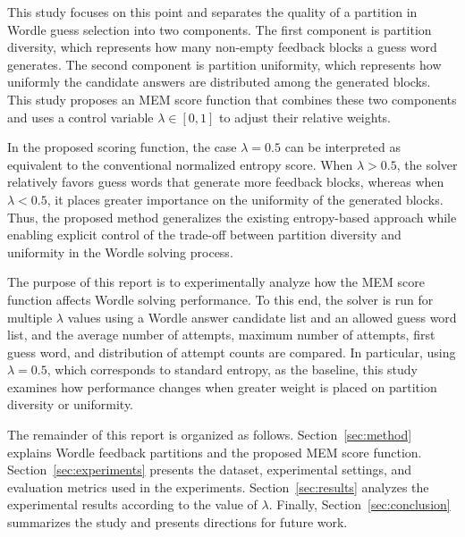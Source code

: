 \documentclass[11pt]{article}
\begin{document}
This study focuses on this point and separates the quality of a partition in Wordle guess selection into two components.
The first component is partition diversity, which represents how many non-empty feedback blocks a guess word generates.
The second component is partition uniformity, which represents how uniformly the candidate answers are distributed among the generated blocks.
This study proposes an MEM score function that combines these two components and uses a control variable $\lambda \in [0,1]$ to adjust their relative weights.

In the proposed scoring function, the case $\lambda = 0.5$ can be interpreted as equivalent to the conventional normalized entropy score.
When $\lambda > 0.5$, the solver relatively favors guess words that generate more feedback blocks, whereas when $\lambda < 0.5$, it places greater importance on the uniformity of the generated blocks.
Thus, the proposed method generalizes the existing entropy-based approach while enabling explicit control of the trade-off between partition diversity and uniformity in the Wordle solving process.

The purpose of this report is to experimentally analyze how the MEM score function affects Wordle solving performance.
To this end, the solver is run for multiple $\lambda$ values using a Wordle answer candidate list and an allowed guess word list, and the average number of attempts, maximum number of attempts, first guess word, and distribution of attempt counts are compared.
In particular, using $\lambda = 0.5$, which corresponds to standard entropy, as the baseline, this study examines how performance changes when greater weight is placed on partition diversity or uniformity.

The remainder of this report is organized as follows.
Section~\ref{sec:method} explains Wordle feedback partitions and the proposed MEM score function.
Section~\ref{sec:experiments} presents the dataset, experimental settings, and evaluation metrics used in the experiments.
Section~\ref{sec:results} analyzes the experimental results according to the value of $\lambda$.
Finally, Section~\ref{sec:conclusion} summarizes the study and presents directions for future work.
\end{document}
